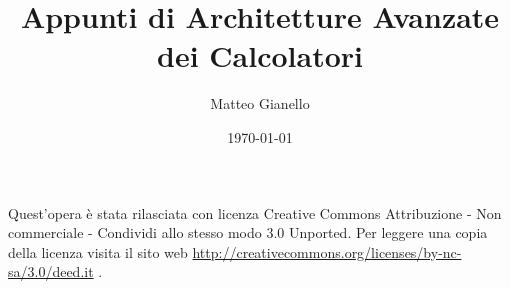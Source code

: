 \documentclass[a4paper,11pt, twoside]{article}
\title{Appunti di Architetture Avanzate dei Calcolatori}
\author{Matteo Gianello}
\date{\today}
\theoremstyle{definition}
\begin{document}
\pagestyle{empty}
\thispagestyle{empty}
\maketitle
\vspace{5cm}
\begin{center}
Quest'opera è stata rilasciata con licenza Creative Commons Attribuzione - Non commerciale - Condividi allo stesso modo 3.0 Unported. Per leggere una copia della licenza visita il sito web \url{http://creativecommons.org/licenses/by-nc-sa/3.0/deed.it} \ccbyncsa.
\end{center}
\newpage

\thispagestyle{plain}
\tableofcontents
\newpage

\pagestyle{plain}



%
%
\end{document}

